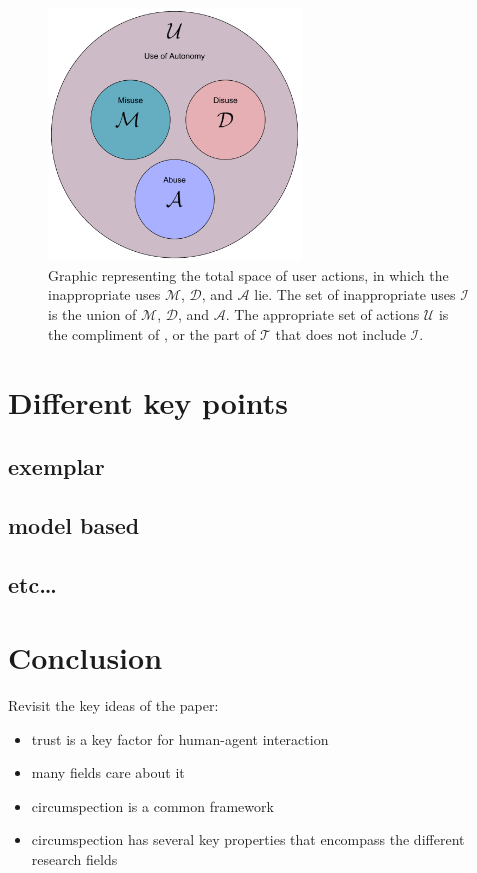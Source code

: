 	\begin{figure}
    	\centering
     	\includegraphics[width=0.6\textwidth]{Figures/misuse_disuse_abuse}
    	\caption{Graphic representing the total space of user actions, in which the inappropriate uses $\mathcal{M}$, $\mathcal{D}$, and $\mathcal{A}$ lie. The set of inappropriate uses $\mathcal{I}$ is the union of $\mathcal{M}$, $\mathcal{D}$, and $\mathcal{A}$. The appropriate set of actions $\mathcal{U}$ is the compliment of , or the part of $\mathcal{T}$ that does not include $\mathcal{I}$.}
    \end{figure}

\section{Different key points}
    \subsection{exemplar}
    \subsection{model based}
    \subsection{etc\ldots}

\section{Conclusion}
    Revisit the key ideas of the paper:

    \begin{itemize}
        \item trust is a key factor for human-agent interaction
        \item many fields care about it
        \item circumspection is a common framework
        \item circumspection has several key properties that encompass the different research fields
    \end{itemize}

\newpage
